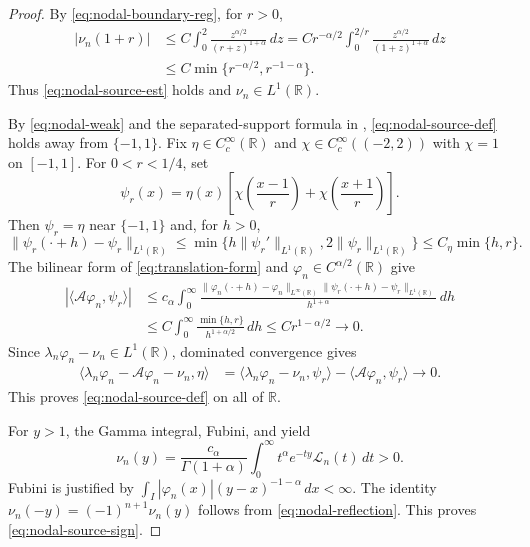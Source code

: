 \documentclass[11pt]{amsart}
\numberwithin{equation}{section}
\theoremstyle{remark}
\newcommand{\R}{\mathbb R}
\newcommand{\norm}[2][]{\lVert #2\rVert_{#1}}
\begin{document}
\begin{proof}




By
\eqref{eq:nodal-boundary-reg}, for $r>0$,
\begin{equation}\label{eq:nodal-source-near}
 \begin{aligned}
 |\nu_n(1+r)|
 &\le C\int_0^2\frac{z^{\alpha/2}}{(r+z)^{1+\alpha}}\,dz
 =Cr^{-\alpha/2}\int_0^{2/r}
       \frac{z^{\alpha/2}}{(1+z)^{1+\alpha}}\,dz\\
 &\le C\min\{r^{-\alpha/2},r^{-1-\alpha}\}.
 \end{aligned}
\end{equation}
Thus \eqref{eq:nodal-source-est} holds and $\nu_n\in L^1(\R)$.

By \eqref{eq:nodal-weak} and the separated-support formula in
, \eqref{eq:nodal-source-def} holds away from
$\{-1,1\}$. Fix $\eta\in C_c^\infty(\R)$ and
$\chi\in C_c^\infty((-2,2))$ with $\chi=1$ on $[-1,1]$. For $0<r<1/4$, set
\[
 \psi_r(x)=\eta(x)\left[\chi\left(\frac{x-1}{r}\right)
                    +\chi\left(\frac{x+1}{r}\right)\right].
\]
Then $\psi_r=\eta$ near $\{-1,1\}$ and, for $h>0$,
\[
 \norm[L^1(\R)]{\psi_r(\cdot+h)-\psi_r}
 \le\min\{h\norm[L^1(\R)]{\psi_r'},2\norm[L^1(\R)]{\psi_r}\}
 \le C_\eta\min\{h,r\}.
\]
The bilinear form of \eqref{eq:translation-form} and
$\varphi_n\in C^{\alpha/2}(\R)$ give
\begin{equation}\label{eq:nodal-no-delta-test}
 \begin{aligned}
 |\langle\mathcal A\varphi_n,\psi_r\rangle|
 &\le c_\alpha\int_0^\infty
 \frac{\norm[L^\infty(\R)]{\varphi_n(\cdot+h)-\varphi_n}
       \norm[L^1(\R)]{\psi_r(\cdot+h)-\psi_r}}{h^{1+\alpha}}\,dh\\
 &\le C\int_0^\infty\frac{\min\{h,r\}}{h^{1+\alpha/2}}\,dh
 \le Cr^{1-\alpha/2}\longrightarrow0.
 \end{aligned}
\end{equation}
Since $\lambda_n\varphi_n-\nu_n\in L^1(\R)$, dominated convergence gives
\[
 \begin{aligned}
 \langle\lambda_n\varphi_n-\mathcal A\varphi_n-\nu_n,\eta\rangle
 &=\langle\lambda_n\varphi_n-\nu_n,\psi_r\rangle
   -\langle\mathcal A\varphi_n,\psi_r\rangle
 \longrightarrow0.
 \end{aligned}
\]
This proves \eqref{eq:nodal-source-def} on all of $\R$.

For $y>1$, the Gamma integral, Fubini, and
 yield
\begin{equation}\label{eq:nodal-source-Laplace}
	\nu_n(y)=\frac{c_\alpha}{\Gamma(1+\alpha)}
	\int_0^\infty t^\alpha e^{-ty}\mathcal L_n(t)\,dt>0.
\end{equation}
Fubini is justified by
$\int_I|\varphi_n(x)|(y-x)^{-1-\alpha}\,dx<\infty$. The identity $\nu_n(-y)=(-1)^{n+1}\nu_n(y)$ follows from
\eqref{eq:nodal-reflection}. This proves \eqref{eq:nodal-source-sign}.
\end{proof}
\end{document}
